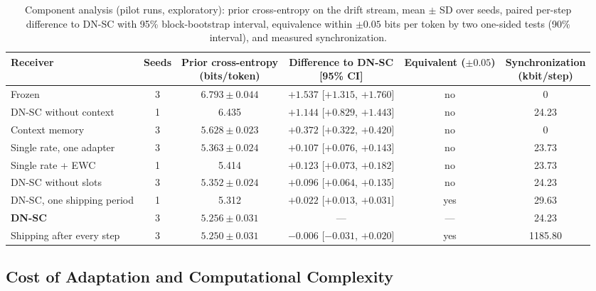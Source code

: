 \begin{table}[!tbp]
\centering
\caption{Component analysis (pilot runs, exploratory): prior cross-entropy on the drift stream, mean $\pm$ SD over seeds, paired per-step difference to DN-SC with 95\% block-bootstrap interval, equivalence within $\pm0.05$ bits per token by two one-sided tests (90\% interval), and measured synchronization.}
\label{tab:ablation}
\footnotesize
\begin{tabular}{@{}lccccc@{}}
\toprule
Receiver & Seeds & \makecell{Prior cross-entropy\\(bits/token)} & \makecell{Difference to DN-SC\\{[95\% CI]}} & \makecell{Equivalent\\($\pm0.05$)} & \makecell{Synchronization\\(kbit/step)} \\
\midrule
Frozen & 3 & $6.793\pm0.044$ & $+1.537$ [$+1.315$, $+1.760$] & no & 0 \\
DN-SC without context & 1 & 6.435 & $+1.144$ [$+0.829$, $+1.443$] & no & 24.23 \\
Context memory & 3 & $5.628\pm0.023$ & $+0.372$ [$+0.322$, $+0.420$] & no & 0 \\
Single rate, one adapter & 3 & $5.363\pm0.024$ & $+0.107$ [$+0.076$, $+0.143$] & no & 23.73 \\
Single rate + EWC & 1 & 5.414 & $+0.123$ [$+0.073$, $+0.182$] & no & 23.73 \\
DN-SC without slots & 3 & $5.352\pm0.024$ & $+0.096$ [$+0.064$, $+0.135$] & no & 24.23 \\
DN-SC, one shipping period & 1 & 5.312 & $+0.022$ [$+0.013$, $+0.031$] & yes & 29.63 \\
\textbf{DN-SC} & 3 & $\mathbf{5.256\pm0.031}$ & --- & --- & 24.23 \\
Shipping after every step & 3 & $5.250\pm0.031$ & $-0.006$ [$-0.031$, $+0.020$] & yes & 1185.80 \\
\bottomrule
\end{tabular}
\end{table}

\subsection{Cost of Adaptation and Computational Complexity}
\label{sec:results-cost}

